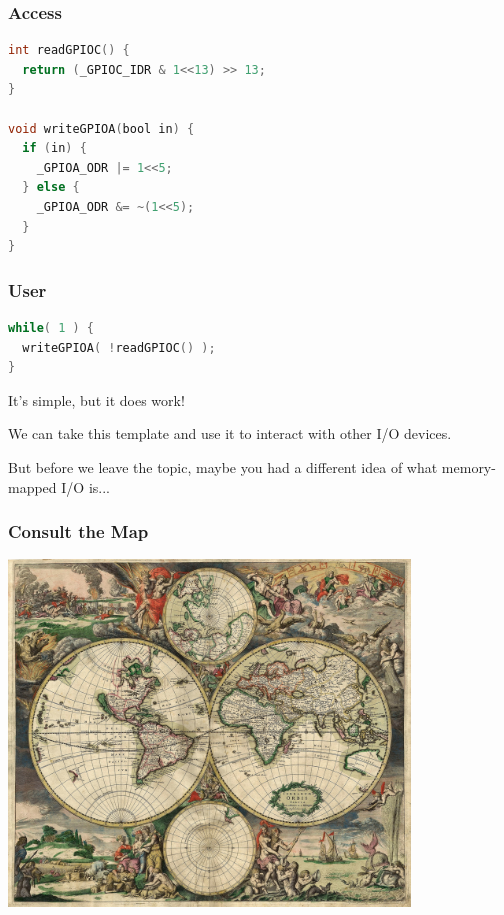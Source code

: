 \begin{frame}[fragile]
\frametitle{Access}

\begin{lstlisting}[language=C]
int readGPIOC() {
  return (_GPIOC_IDR & 1<<13) >> 13;
}

void writeGPIOA(bool in) {
  if (in) {
    _GPIOA_ODR |= 1<<5;
  } else {
    _GPIOA_ODR &= ~(1<<5);
  }
}
\end{lstlisting}

\end{frame}

\begin{frame}[fragile]
\frametitle{User}

\begin{lstlisting}[language=C]
while( 1 ) {
  writeGPIOA( !readGPIOC() ); 
}
\end{lstlisting}

It's simple, but it does work!

We can take this template and use it to interact with other I/O devices.

But before we leave the topic, maybe you had a different idea of what memory-mapped I/O is...

\end{frame}



\begin{frame}
	\frametitle{Consult the Map}

	\begin{center}
		\includegraphics[width=0.8\textwidth]{images/worldmap.jpg}
	\end{center}


\end{frame}


